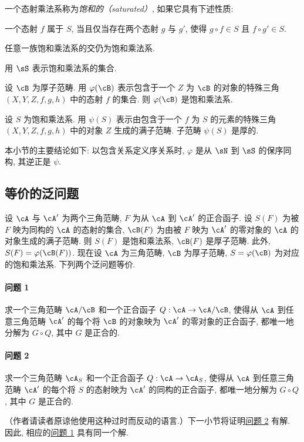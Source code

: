 一个态射乘法系称为\emph{饱和的（saturated）}, 如果它具有下述性质:

一个态射 $f$ 属于 $S$, 当且仅当存在两个态射 $g$ 与 $g'$, 使得 $g\circ f\in S$ 且 $f\circ g'\in S$.

任意一族饱和乘法系的交仍为饱和乘法系.

用 $\sS$ 表示饱和乘法系的集合.

设 $\cB$ 为厚子范畴. 用 $\varphi(\cB)$ 表示包含于一个 $Z$ 为 $\cB$ 的对象的特殊三角 \allowbreak$(X,Y,Z,f,g,h)$ 中的态射 $f$ 的集合. 则 $\varphi(\cB)$ 是饱和乘法系.

设 $S$ 为饱和乘法系. 用 $\psi(S)$ 表示由包含于一个 $f$ 为 $S$ 的元素的特殊三角 $(X,Y,Z,f,g,h)$ 中的对象 $Z$ 生成的满子范畴. 子范畴 $\psi(S)$ 是厚的.

本小节的主要结论如下: 以包含关系定义序关系时, $\varphi$ 是从 $\sN$ 到 $\sS$ 的保序同构, 其逆正是 $\psi$.

\subsection{等价的泛问题}\label{VIII:2-2}

设 $\cA$ 与 $\cA'$ 为两个三角范畴, $F$ 为从 $\cA$ 到 $\cA'$ 的正合函子. 设 $S(F)$ 为被 $F$ 映为同构的 $\cA$ 的态射的集合, $\cB(F)$ 为由被 $F$ 映为 $\cA'$ 的零对象的 $\cA$ 的对象生成的满子范畴. 则 $S(F)$ 是饱和乘法系, $\cB(F)$ 是厚子范畴. 此外, $S(F) = \varphi(\cB(F))$. 现在设 $\cA$ 为三角范畴, $\cB$ 为厚子范畴, $S=\varphi(\cB)$ 为对应的饱和乘法系. 下列两个泛问题等价.

\paragraph{问题 1}
\hypertarget{VIII:prob1}{}
求一个三角范畴 $\cA/\cB$ 和一个正合函子 $Q:\cA\to \cA/\cB$, 使得从 $\cA$ 到任意三角范畴 $\cA'$ 的每个将 $\cB$ 的对象映为 $\cA'$ 的零对象的正合函子, 都唯一地分解为 $G\circ Q$, 其中 $G$ 是正合的.

\paragraph{问题 2}
\hypertarget{VIII:prob2}{}
求一个三角范畴 $\cA_S$ 和一个正合函子 $Q:\cA\to \cA_S$, 使得从 $\cA$ 到任意三角范畴 $\cA'$ 的每个将 $S$ 的态射映为 $\cA'$ 的同构的正合函子, 都唯一地分解为 $G\circ Q$, 其中 $G$ 是正合的.

（作者请读者原谅他使用这种过时而反动的语言.）下一小节将证明\hyperlink{VIII:prob2}{问题 2} 有解. 因此, 相应的\hyperlink{VIII:prob1}{问题 1} 具有同一个解.

